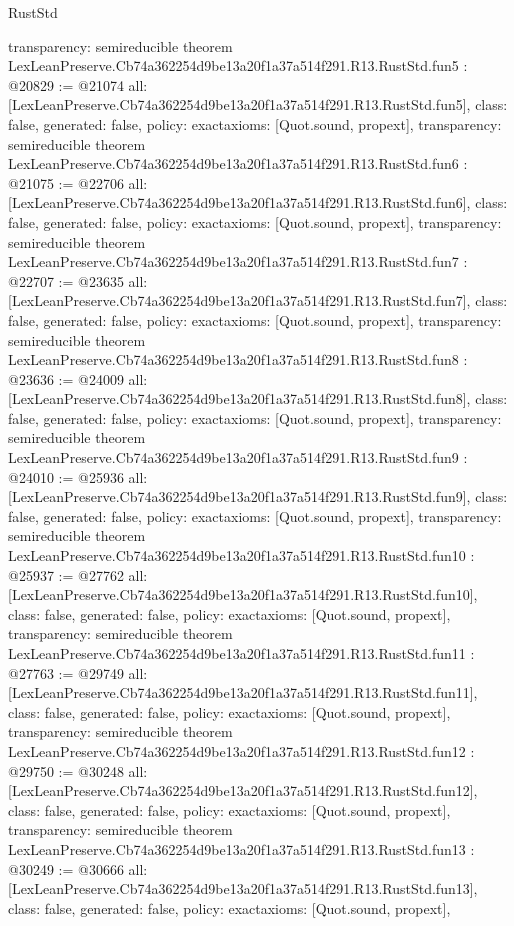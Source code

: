 \begin{lexlean}{RustStd}
\begin{coremodule}
{  transparency: semireducible
}
theorem LexLeanPreserve.Cb74a362254d9be13a20f1a37a514f291.R13.RustStd.fun5 : @20829 := @21074 {
  all: [LexLeanPreserve.Cb74a362254d9be13a20f1a37a514f291.R13.RustStd.fun5],
  class: false,
  generated: false,
  policy: exact{axioms: [Quot.sound, propext]},
  transparency: semireducible
}
theorem LexLeanPreserve.Cb74a362254d9be13a20f1a37a514f291.R13.RustStd.fun6 : @21075 := @22706 {
  all: [LexLeanPreserve.Cb74a362254d9be13a20f1a37a514f291.R13.RustStd.fun6],
  class: false,
  generated: false,
  policy: exact{axioms: [Quot.sound, propext]},
  transparency: semireducible
}
theorem LexLeanPreserve.Cb74a362254d9be13a20f1a37a514f291.R13.RustStd.fun7 : @22707 := @23635 {
  all: [LexLeanPreserve.Cb74a362254d9be13a20f1a37a514f291.R13.RustStd.fun7],
  class: false,
  generated: false,
  policy: exact{axioms: [Quot.sound, propext]},
  transparency: semireducible
}
theorem LexLeanPreserve.Cb74a362254d9be13a20f1a37a514f291.R13.RustStd.fun8 : @23636 := @24009 {
  all: [LexLeanPreserve.Cb74a362254d9be13a20f1a37a514f291.R13.RustStd.fun8],
  class: false,
  generated: false,
  policy: exact{axioms: [Quot.sound, propext]},
  transparency: semireducible
}
theorem LexLeanPreserve.Cb74a362254d9be13a20f1a37a514f291.R13.RustStd.fun9 : @24010 := @25936 {
  all: [LexLeanPreserve.Cb74a362254d9be13a20f1a37a514f291.R13.RustStd.fun9],
  class: false,
  generated: false,
  policy: exact{axioms: [Quot.sound, propext]},
  transparency: semireducible
}
theorem LexLeanPreserve.Cb74a362254d9be13a20f1a37a514f291.R13.RustStd.fun10 : @25937 := @27762 {
  all: [LexLeanPreserve.Cb74a362254d9be13a20f1a37a514f291.R13.RustStd.fun10],
  class: false,
  generated: false,
  policy: exact{axioms: [Quot.sound, propext]},
  transparency: semireducible
}
theorem LexLeanPreserve.Cb74a362254d9be13a20f1a37a514f291.R13.RustStd.fun11 : @27763 := @29749 {
  all: [LexLeanPreserve.Cb74a362254d9be13a20f1a37a514f291.R13.RustStd.fun11],
  class: false,
  generated: false,
  policy: exact{axioms: [Quot.sound, propext]},
  transparency: semireducible
}
theorem LexLeanPreserve.Cb74a362254d9be13a20f1a37a514f291.R13.RustStd.fun12 : @29750 := @30248 {
  all: [LexLeanPreserve.Cb74a362254d9be13a20f1a37a514f291.R13.RustStd.fun12],
  class: false,
  generated: false,
  policy: exact{axioms: [Quot.sound, propext]},
  transparency: semireducible
}
theorem LexLeanPreserve.Cb74a362254d9be13a20f1a37a514f291.R13.RustStd.fun13 : @30249 := @30666 {
  all: [LexLeanPreserve.Cb74a362254d9be13a20f1a37a514f291.R13.RustStd.fun13],
  class: false,
  generated: false,
  policy: exact{axioms: [Quot.sound, propext]},
}
\end{coremodule}
\end{lexlean}
